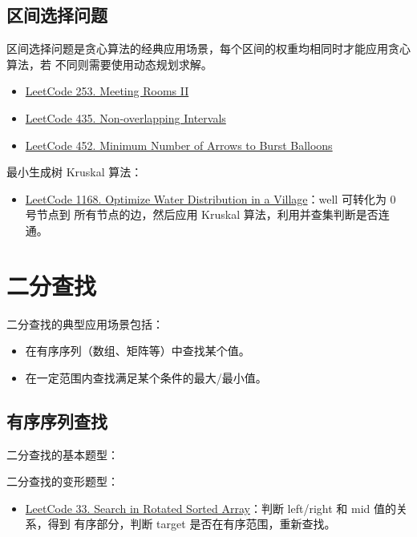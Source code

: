 \subsection{区间选择问题}
区间选择问题是贪心算法的经典应用场景，每个区间的权重均相同时才能应用贪心算法，若
不同则需要使用动态规划求解。

\begin{itemize}
  \item
    \href{https://leetcode.com/problems/meeting-rooms-ii}{LeetCode 253. Meeting
      Rooms II}
  \item
    \href{https://leetcode.com/problems/non-overlapping-intervals/}{LeetCode
      435. Non-overlapping Intervals}
  \item
    \href{https://leetcode.com/problems/minimum-number-of-arrows-to-burst-balloons/}{LeetCode
      452. Minimum Number of Arrows to Burst Balloons}
\end{itemize}

最小生成树 Kruskal 算法：
\begin{itemize}
  \item
    \href{https://leetcode.com/problems/optimize-water-distribution-in-a-village}{LeetCode
      1168. Optimize Water Distribution in a Village}：well 可转化为 0 号节点到
    所有节点的边，然后应用 Kruskal 算法，利用并查集判断是否连通。
\end{itemize}

\section{二分查找}
二分查找的典型应用场景包括：

\begin{itemize}
  \item 在有序序列（数组、矩阵等）中查找某个值。
  \item 在一定范围内查找满足某个条件的最大/最小值。
\end{itemize}

\subsection{有序序列查找}
二分查找的基本题型：

二分查找的变形题型：
\begin{itemize}
  \item
    \href{https://leetcode.com/problems/search-in-rotated-sorted-array/}{LeetCode
      33. Search in Rotated Sorted Array}：判断 left/right 和 mid 值的关系，得到
    有序部分，判断 target 是否在有序范围，重新查找。
\end{itemize}

